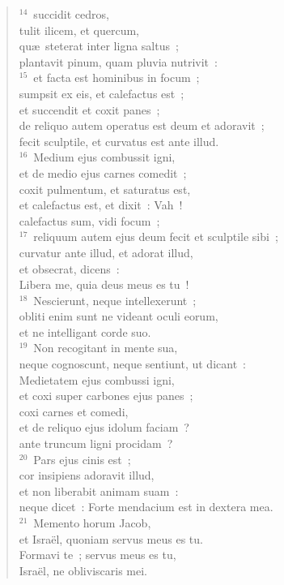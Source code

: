 \begin{flushleft}
\begin{verse}
${}^{14}$~succidit cedros,\\ tulit ilicem, et quercum,\\ qu\ae\ steterat inter ligna saltus~;\\ plantavit pinum, quam pluvia nutrivit~:\\
${}^{15}$~et facta est hominibus in focum~;\\ sumpsit ex eis, et calefactus est~;\\ et succendit et coxit panes~;\\ de reliquo autem operatus est deum et adoravit~;\\ fecit sculptile, et curvatus est ante illud.\\
${}^{16}$~Medium ejus combussit igni,\\ et de medio ejus carnes comedit~;\\ coxit pulmentum, et saturatus est,\\ et calefactus est, et dixit~: Vah~!\\ calefactus sum, vidi focum~;\\
${}^{17}$~reliquum autem ejus deum fecit et sculptile sibi~;\\ curvatur ante illud, et adorat illud,\\ et obsecrat, dicens~:\\ Libera me, quia deus meus es tu~!\\
${}^{18}$~Nescierunt, neque intellexerunt~;\\ obliti enim sunt ne videant oculi eorum,\\ et ne intelligant corde suo.\\
${}^{19}$~Non recogitant in mente sua,\\ neque cognoscunt, neque sentiunt, ut dicant~:\\ Medietatem ejus combussi igni,\\ et coxi super carbones ejus panes~;\\ coxi carnes et comedi,\\ et de reliquo ejus idolum faciam~?\\ ante truncum ligni procidam~?\\
${}^{20}$~Pars ejus cinis est~;\\ cor insipiens adoravit illud,\\ et non liberabit animam suam~:\\ neque dicet~: Forte mendacium est in dextera mea.\\
${}^{21}$~Memento horum Jacob,\\ et Isra\"el, quoniam servus meus es tu.\\ Formavi te~; servus meus es tu,\\ Isra\"el, ne obliviscaris mei.\\

\end{verse}
\end{flushleft}

